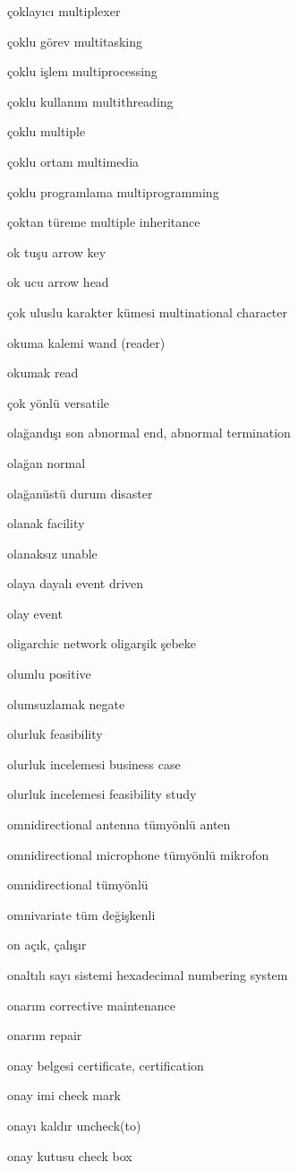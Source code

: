 \documentclass[12pt,fleqn]{article}\usepackage{../../common}
\begin{document}
çoklayıcı multiplexer

çoklu görev multitasking

çoklu işlem multiprocessing

çoklu kullanım multithreading

çoklu multiple

çoklu ortam multimedia

çoklu programlama multiprogramming

çoktan türeme multiple inheritance

ok tuşu arrow key

ok ucu arrow head

çok uluslu karakter kümesi multinational character

okuma kalemi wand (reader)

okumak read

çok yönlü versatile

olağandışı son abnormal end, abnormal termination

olağan normal

olağanüstü durum disaster

olanak facility

olanaksız unable

olaya dayalı event driven

olay event

oligarchic network oligarşik şebeke

olumlu positive

olumsuzlamak negate

olurluk feasibility

olurluk incelemesi business case

olurluk incelemesi feasibility study

omnidirectional antenna tümyönlü anten

omnidirectional microphone tümyönlü mikrofon

omnidirectional tümyönlü

omnivariate tüm değişkenli

on açık, çalışır

onaltılı sayı sistemi hexadecimal numbering system

onarım corrective maintenance

onarım repair

onay belgesi certificate, certification

onay imi check mark

onayı kaldır uncheck(to)

onay kutusu check box
\end{document}
